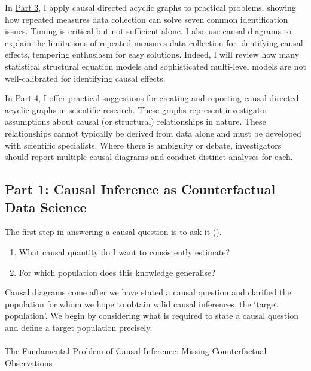 \documentclass[
  single column]{article}
\makeatletter
\let\oldparagraph\paragraph
\renewcommand{\paragraph}{
    \@ifstar
      \xxxParagraphStar
      \xxxParagraphNoStar
  }
\newcommand{\xxxParagraphStar}[1]{\oldparagraph*{#1}\mbox{}}
\newcommand{\xxxParagraphNoStar}[1]{\oldparagraph{#1}\mbox{}}
\providecommand{\tightlist}{%
  \setlength{\itemsep}{0pt}\setlength{\parskip}{0pt}}\usepackage{longtable,booktabs,array}
\makeatother
\begin{document}
In \hyperref[id-sec-3]{Part 3}, I apply causal directed acyclic graphs
to practical problems, showing how repeated measures data collection can
solve seven common identification issues. Timing is critical but not
sufficient alone. I also use causal diagrams to explain the limitations
of repeated-measures data collection for identifying causal effects,
tempering enthusiasm for easy solutions. Indeed, I will review how many
statistical structural equation models and sophisticated multi-level
models are not well-calibrated for identifying causal effects.

In \hyperref[id-sec-4]{Part 4}, I offer practical suggestions for
creating and reporting causal directed acyclic graphs in scientific
research. These graphs represent investigator assumptions about causal
(or structural) relationships in nature. These relationships cannot
typically be derived from data alone and must be developed with
scientific specialists. Where there is ambiguity or debate,
investigators should report multiple causal diagrams and conduct
distinct analyses for each.

\subsection{Part 1: Causal Inference as Counterfactual Data
Science}\label{id-sec-1}

The first step in answering a causal question is to ask it
().

\begin{enumerate}
\def\labelenumi{\arabic{enumi}.}
\tightlist
\item
  What causal quantity do I want to consistently estimate?
\item
  For which population does this knowledge generalise?
\end{enumerate}

Causal diagrams come after we have stated a causal question and
clarified the population for whom we hope to obtain valid causal
inferences, the `target population'. We begin by considering what is
required to state a causal question and define a target population
precisely.

\paragraph{The Fundamental Problem of Causal Inference: Missing
Counterfactual
Observations}\label{the-fundamental-problem-of-causal-inference-missing-counterfactual-observations}
\end{document}
